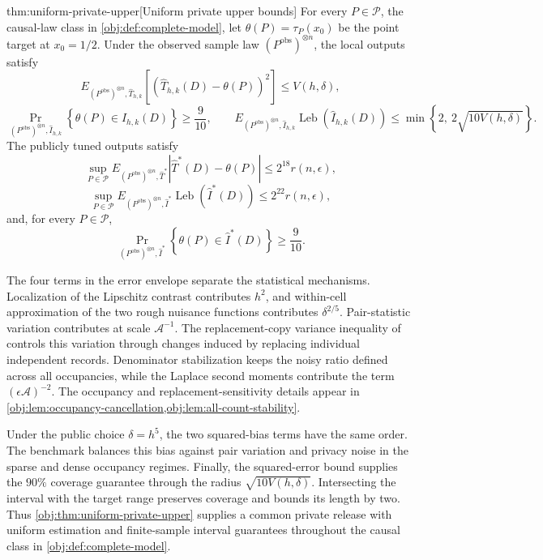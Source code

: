 \documentclass[11pt]{article}
\begin{document}
\begin{theoremv}{thm:uniform-private-upper}[Uniform private upper bounds]
For every \(P\in\mathcal P\), the causal-law class in
\cref{obj:def:complete-model}, let \(\theta(P)=\tau_P(x_0)\) be the point
target at \(x_0=1/2\). Under the observed sample law
\((P^{\mathrm{obs}})^{\otimes n}\), the local outputs satisfy
\[
E_{(P^{\mathrm{obs}})^{\otimes n},\widehat T_{h,k}}
\left[(\widehat T_{h,k}(D)-\theta(P))^2\right]
\le V(h,\delta),
\]
\[
\Pr_{(P^{\mathrm{obs}})^{\otimes n},\widehat I_{h,k}}
\left\{\theta(P)\in\widehat I_{h,k}(D)\right\}
\ge\frac9{10},
\qquad
E_{(P^{\mathrm{obs}})^{\otimes n},\widehat I_{h,k}}
\operatorname{Leb}(\widehat I_{h,k}(D))
\le\min\left\{2,\ 2\sqrt{10V(h,\delta)}\right\}.
\]
The publicly tuned outputs satisfy
\[
\sup_{P\in\mathcal P}
E_{(P^{\mathrm{obs}})^{\otimes n},\widehat T^*}
\left|\widehat T^*(D)-\theta(P)\right|
\le2^{18}r(n,\epsilon),
\]
\[
\sup_{P\in\mathcal P}
E_{(P^{\mathrm{obs}})^{\otimes n},\widehat I^*}
\operatorname{Leb}(\widehat I^*(D))
\le2^{22}r(n,\epsilon),
\]
and, for every \(P\in\mathcal P\),
\[
\Pr_{(P^{\mathrm{obs}})^{\otimes n},\widehat I^*}
\left\{\theta(P)\in\widehat I^*(D)\right\}
\ge\frac9{10}.
\]
\end{theoremv}

The four terms in the error envelope separate the statistical mechanisms. Localization of the Lipschitz contrast contributes \(h^2\), and within-cell approximation of the two rough nuisance functions contributes \(\delta^{2/5}\). Pair-statistic variation contributes at scale \(\mathcal A^{-1}\). The replacement-copy variance inequality of \citet[Theorem 3.1, replacement-copy form, p.~54]{BoucheronLugosiMassart2013} controls this variation through changes induced by replacing individual independent records. Denominator stabilization keeps the noisy ratio defined across all occupancies, while the Laplace second moments contribute the term \((\epsilon\mathcal A)^{-2}\). The occupancy and replacement-sensitivity details appear in \cref{obj:lem:occupancy-cancellation,obj:lem:all-count-stability}.

Under the public choice \(\delta=h^5\), the two squared-bias terms have the same order. The benchmark balances this bias against pair variation and privacy noise in the sparse and dense occupancy regimes. Finally, the squared-error bound supplies the \(90\%\) coverage guarantee through the radius \(\sqrt{10V(h,\delta)}\). Intersecting the interval with the target range preserves coverage and bounds its length by two. Thus \cref{obj:thm:uniform-private-upper} supplies a common private release with uniform estimation and finite-sample interval guarantees throughout the causal class in \cref{obj:def:complete-model}.
\end{document}
